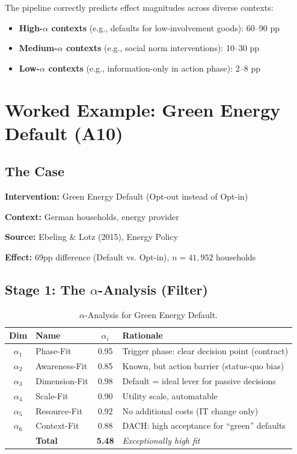 The pipeline correctly predicts effect magnitudes across diverse contexts:
\begin{itemize}[nosep]
\item \textbf{High-$\alpha$ contexts} (e.g., defaults for low-involvement goods): 60--90 pp
\item \textbf{Medium-$\alpha$ contexts} (e.g., social norm interventions): 10--30 pp
\item \textbf{Low-$\alpha$ contexts} (e.g., information-only in action phase): 2--8 pp
\end{itemize}


\section{Worked Example: Green Energy Default (A10)}
\label{sec:iii-example}

\subsection{The Case}

\textbf{Intervention:} Green Energy Default (Opt-out instead of Opt-in)

\textbf{Context:} German households, energy provider

\textbf{Source:} Ebeling \& Lotz (2015), Energy Policy

\textbf{Effect:} 69pp difference (Default vs. Opt-in), $n = 41{,}952$ households

\subsection{Stage 1: The $\alpha$-Analysis (Filter)}

\begin{table}[h]
\centering
\begin{tabular}{clcp{6cm}}
\toprule
\textbf{Dim} & \textbf{Name} & \textbf{$\alpha_i$} & \textbf{Rationale} \\
\midrule
$\alpha_1$ & Phase-Fit & 0.95 & Trigger phase: clear decision point (contract) \\
$\alpha_2$ & Awareness-Fit & 0.85 & Known, but action barrier (status-quo bias) \\
$\alpha_3$ & Dimension-Fit & 0.98 & Default = ideal lever for passive decisions \\
$\alpha_4$ & Scale-Fit & 0.90 & Utility scale, automatable \\
$\alpha_5$ & Resource-Fit & 0.92 & No additional costs (IT change only) \\
$\alpha_6$ & Context-Fit & 0.88 & DACH: high acceptance for ``green'' defaults \\
\midrule
& \textbf{Total} & \textbf{5.48} & \emph{Exceptionally high fit} \\
\bottomrule
\end{tabular}
\caption{$\alpha$-Analysis for Green Energy Default.}
\end{table}

